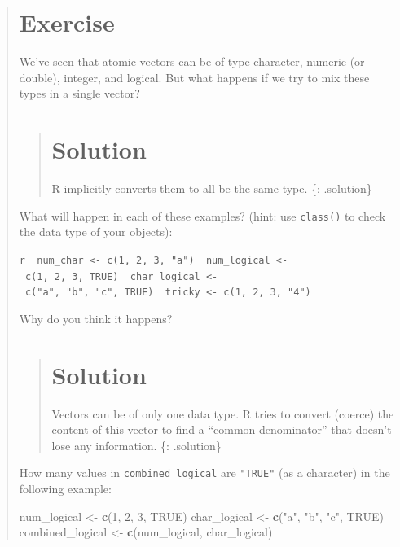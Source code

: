 \documentclass[]{book}
\newenvironment{Shaded}{\begin{snugshade}}{\end{snugshade}}
\newcommand{\KeywordTok}[1]{\textcolor[rgb]{0.13,0.29,0.53}{\textbf{#1}}}
\newcommand{\DecValTok}[1]{\textcolor[rgb]{0.00,0.00,0.81}{#1}}
\newcommand{\StringTok}[1]{\textcolor[rgb]{0.31,0.60,0.02}{#1}}
\newcommand{\OtherTok}[1]{\textcolor[rgb]{0.56,0.35,0.01}{#1}}
\newcommand{\NormalTok}[1]{#1}
\begin{document}
\begin{quote}
\section{Exercise}\label{exercise-4}

We've seen that atomic vectors can be of type character, numeric (or
double), integer, and logical. But what happens if we try to mix these
types in a single vector?

\begin{quote}
\section{Solution}\label{solution-3}

R implicitly converts them to all be the same type. \{: .solution\}
\end{quote}

What will happen in each of these examples? (hint: use \texttt{class()}
to check the data type of your objects):

\texttt{r\ \ num\_char\ \textless{}-\ c(1,\ 2,\ 3,\ "a")\ \ num\_logical\ \textless{}-\ c(1,\ 2,\ 3,\ TRUE)\ \ char\_logical\ \textless{}-\ c("a",\ "b",\ "c",\ TRUE)\ \ tricky\ \textless{}-\ c(1,\ 2,\ 3,\ "4")}

Why do you think it happens?

\begin{quote}
\section{Solution}\label{solution-4}

Vectors can be of only one data type. R tries to convert (coerce) the
content of this vector to find a ``common denominator'' that doesn't
lose any information. \{: .solution\}
\end{quote}

How many values in \texttt{combined\_logical} are \texttt{"TRUE"} (as a
character) in the following example:

\begin{Shaded}
\begin{Highlighting}[]
\NormalTok{num_logical <-}\StringTok{ }\KeywordTok{c}\NormalTok{(}\DecValTok{1}\NormalTok{, }\DecValTok{2}\NormalTok{, }\DecValTok{3}\NormalTok{, }\OtherTok{TRUE}\NormalTok{)}
\NormalTok{char_logical <-}\StringTok{ }\KeywordTok{c}\NormalTok{(}\StringTok{"a"}\NormalTok{, }\StringTok{"b"}\NormalTok{, }\StringTok{"c"}\NormalTok{, }\OtherTok{TRUE}\NormalTok{)}
\NormalTok{combined_logical <-}\StringTok{ }\KeywordTok{c}\NormalTok{(num_logical, char_logical)}
\end{Highlighting}
\end{Shaded}


\end{quote}
\end{document}
